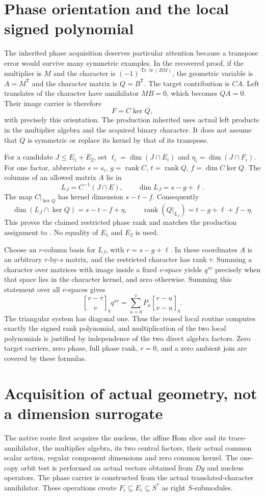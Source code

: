 \documentclass[11pt]{article}
\newcommand{\rank}{\operatorname{rank}}
\newcommand{\gb}[2]{{#1\brack #2}_q}
\begin{document}
\section{Phase orientation and the local signed polynomial}
The inherited phase acquisition deserves particular attention because a
transpose error would survive many symmetric examples. In the recovered
proof, if the multiplier is $M$ and the character is
$(-1)^{\operatorname{Tr}\operatorname{tr}(BM)}$, the geometric variable is
$A=M^{\mathsf T}$ and the character matrix is $Q=B^{\mathsf T}$.
The target contribution is $CA$. Left translates of the character have
annihilator $MB=0$, which becomes $QA=0$. Their image carrier is therefore
\[
 F=C\ker Q,
\]
with precisely this orientation. The production inherited
 uses actual left products in the
multiplier algebra and the acquired binary character. It does not assume
that $Q$ is symmetric or replace its kernel by that of its transpose.

For a candidate $J\le E_1+E_2$, set
$\ell_i=\dim(J\cap E_i)$ and $\eta_i=\dim(J\cap F_i)$.
For one factor, abbreviate $s=s_i$, $g=\rank C$, $t=\rank Q$,
$f=\dim C\ker Q$. The columns of an allowed matrix $A$ lie in
\[
 L_J=C^{-1}(J\cap E),\qquad \dim L_J=s-g+\ell.
\]
The map $C|_{\ker Q}$ has kernel dimension $s-t-f$. Consequently
\[
 \dim(L_J\cap\ker Q)=s-t-f+\eta,
 \qquad
 \rank(Q|_{L_J})=t-g+\ell+f-\eta.
\]
This proves the claimed restricted phase rank and matches the production
assignment to . No equality of $E_1$ and $E_2$ is used.

Choose an $r$-column basis for $L_J$, with $r=s-g+\ell$. In these
coordinates $A$ is an arbitrary $r$-by-$s$ matrix, and the restricted
character has rank $\tau$. Summing a character over matrices with image
inside a fixed $v$-space yields $q^{sv}$ precisely when that space lies
in the character kernel, and zero otherwise. Summing this statement over
all $v$-spaces gives
\[
 \gb{r-\tau}{v}q^{sv}
   =\sum_{u=0}^{v}P_u\gb{r-u}{v-u}.
\]
The triangular system has diagonal one. Thus the reused local routine
computes exactly the signed rank polynomial, and multiplication of the
two local polynomials is justified by independence of the two direct
algebra factors. Zero target carriers, zero phase, full phase rank,
$r=0$, and a zero ambient join are covered by these formulas.

\section{Acquisition of actual geometry, not a dimension surrogate}
The native route first acquires the nucleus, the affine Hom slice and its
trace-annihilator, the multiplier algebra, its two central factors, their
actual common scalar action, regular component dimensions and zero common
kernel. The one-copy orbit test is performed on actual vectors obtained
from $Dy$ and nucleus operators. The phase carrier is constructed from
the actual translated-character annihilator. These operations create
$F_i\subseteq E_i\subseteq S^*$ as right $S$-submodules.
\end{document}
